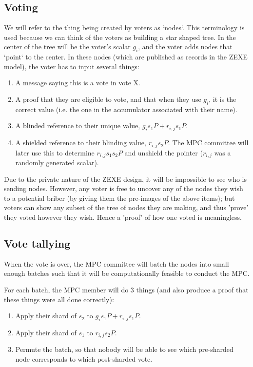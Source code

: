 \documentclass{article}
\begin{document}
\subsection{Voting}
We will refer to the thing being created by voters as `nodes`. This terminology is used because we can think of the voters as building a star shaped tree. In the center of the tree will be the voter's scalar $g_i$, and the voter adds nodes that `point` to the center. In these nodes (which are published as records in the ZEXE model), the voter has to input several things:
\begin{enumerate}
    \item A message saying this is a vote in vote X.
    \item A proof that they are eligible to vote, and that when they use $g_i$, it is the correct value (i.e. the one in the accumulator associated with their name).
    \item A blinded reference to their unique value, $g_is_1P+r_{i,j}s_1P$.
    \item A shielded reference to their blinding value, $r_{i,j}s_2P$. The MPC committee will later use this to determine $r_{i,j}s_1s_2P$ and unshield the pointer ($r_{i,j}$ was a randomly generated scalar).
\end{enumerate}

Due to the private nature of the ZEXE design, it will be impossible to see who is sending nodes. However, any voter is free to uncover any of the nodes they wish to a potential briber (by giving them the pre-images of the above items); but voters can show any subset of the tree of nodes they are making, and thus 'prove' they voted however they wish. Hence a 'proof' of how one voted is meaningless.

\subsection{Vote tallying}
When the vote is over, the MPC committee will batch the nodes into small enough batches such that it will be computationally feasible to conduct the MPC.

For each batch, the MPC member will do 3 things (and also produce a proof that these things were all done correctly):
\begin{enumerate}
    \item Apply their shard of $s_2$ to $g_is_1P+r_{i,j}s_1P$.
    \item Apply their shard of $s_1$ to $r_{i,j}s_2P$.
    \item Permute the batch, so that nobody will be able to see which pre-sharded node corresponds to which post-sharded vote.
\end{enumerate}
\end{document}
